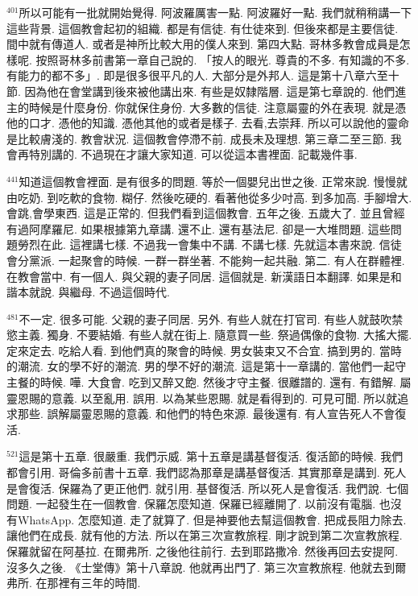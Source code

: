 \documentclass{book}
\begin{document}
$^{401}$所以可能有一批就開始覺得.
阿波羅厲害一點.
阿波羅好一點.
我們就稍稍講一下這些背景.
這個教會起初的組織.
都是有信徒.
有仕徒來到.
但後來都是主要信徒.
間中就有傳道人.
或者是神所比較大用的僕人來到.
第四大點.
哥林多教會成員是怎樣呢.
按照哥林多前書第一章自己說的.
「按人的眼光.
尊貴的不多.
有知識的不多.
有能力的都不多」.
即是很多很平凡的人.
大部分是外邦人.
這是第十八章六至十節.
因為他在會堂講到後來被他講出來.
有些是奴隸階層.
這是第七章說的.
他們進主的時候是什麼身份.
你就保住身份.
大多數的信徒.
注意屬靈的外在表現.
就是憑他的口才.
憑他的知識.
憑他其他的或者是樣子.
去看,去崇拜.
所以可以說他的靈命是比較膚淺的.
教會狀況.
這個教會停滯不前.
成長未及理想.
第三章二至三節.
我會再特別講的.
不過現在才讓大家知道.
可以從這本書裡面.
記載幾件事.

$^{441}$知道這個教會裡面.
是有很多的問題.
等於一個嬰兒出世之後.
正常來說.
慢慢就由吃奶.
到吃軟的食物.
糊仔.
然後吃硬的.
看著他從多少吋高.
到多加高.
手腳增大.
會跳,會學東西.
這是正常的.
但我們看到這個教會.
五年之後.
五歲大了.
並且曾經有過阿摩羅尼.
如果根據第九章講.
還不止.
還有基法尼.
卻是一大堆問題.
這些問題勞烈在此.
這裡講七樣.
不過我一會集中不講.
不講七樣.
先就這本書來說.
信徒會分黨派.
一起聚會的時候.
一群一群坐著.
不能夠一起共融.
第二.
有人在群體裡.
在教會當中.
有一個人.
與父親的妻子同居.
這個就是.
新漢語日本翻譯.
如果是和諧本就說.
與繼母.
不過這個時代.

$^{481}$不一定.
很多可能.
父親的妻子同居.
另外.
有些人就在打官司.
有些人就鼓吹禁慾主義.
獨身.
不要結婚.
有些人就在街上.
隨意買一些.
祭過偶像的食物.
大搖大擺.
定來定去.
吃給人看.
到他們真的聚會的時候.
男女裝束又不合宜.
搞到男的.
當時的潮流.
女的學不好的潮流.
男的學不好的潮流.
這是第十一章講的.
當他們一起守主餐的時候.
嘩.
大食會.
吃到又醉又飽.
然後才守主餐.
很離譜的.
還有.
有錯解.
屬靈恩賜的意義.
以至亂用.
誤用.
以為某些恩賜.
就是看得到的.
可見可聞.
所以就追求那些.
誤解屬靈恩賜的意義.
和他們的特色來源.
最後還有.
有人宣告死人不會復活.

$^{521}$這是第十五章.
很嚴重.
我們示威.
第十五章是講基督復活.
復活節的時候.
我們都會引用.
哥倫多前書十五章.
我們認為那章是講基督復活.
其實那章是講到.
死人是會復活.
保羅為了更正他們.
就引用.
基督復活.
所以死人是會復活.
我們說.
七個問題.
一起發生在一個教會.
保羅怎麼知道.
保羅已經離開了.
以前沒有電腦.
也沒有WhatsApp.
怎麼知道.
走了就算了.
但是神要他去幫這個教會.
把成長阻力除去.
讓他們在成長.
就有他的方法.
所以在第三次宣教旅程.
剛才說到第二次宣教旅程.
保羅就留在阿基拉.
在爾弗所.
之後他往前行.
去到耶路撒冷.
然後再回去安提阿.
沒多久之後.
《士堂傳》第十八章說.
他就再出門了.
第三次宣教旅程.
他就去到爾弗所.
在那裡有三年的時間.
\end{document}
